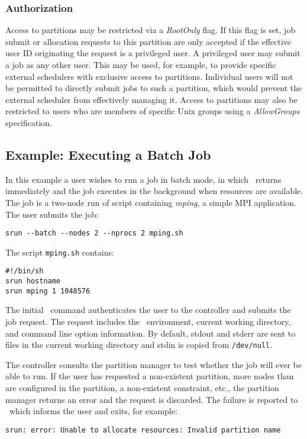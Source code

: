\documentclass[10pt,onecolumn,times]{../common/llncs}
\begin{document}
{\subsubsection{Authorization}

Access to partitions may be restricted via a {\em RootOnly} flag.
If this flag is set, job submit or allocation requests to this partition
are only accepted if the effective user ID originating the request is a
privileged user.  A privileged user may submit a job as any other user.
This may be used, for example, to provide specific external schedulers
with exclusive access to partitions.  Individual users will not be
permitted to directly submit jobs to such a partition, which would
prevent the external scheduler from effectively managing it.  Access to
partitions may also be restricted to users who are members of specific
Unix groups using a {\em AllowGroups} specification.

\subsection{Example: Executing a Batch Job}

In this example a user wishes to run a job in batch mode, in which \srun\
returns immediately and the job executes in the background when resources
are available.  The job is a two-node run of script containing {\em mping}, 
a simple MPI application.  The user submits the job:

\begin{verbatim}
srun --batch --nodes 2 --nprocs 2 mping.sh
\end{verbatim}
The script {\tt mping.sh} contains:
\begin{verbatim}
#!/bin/sh
srun hostname
srun mping 1 1048576
\end{verbatim}

The initial \srun\ command authenticates the user to the controller and
submits the job request.  The request includes the \srun\ environment,
current working directory, and command line option information. By
default, stdout and stderr are sent to files in the current working
directory and stdin is copied from {\tt /dev/null}.

The controller consults the partition manager to test whether the job 
will ever be able to run.  If the user has requested a non-existent partition,
more nodes than are configured in the partition, a non-existent constraint, 
etc., the partition manager returns an error and the request is discarded.
The failure is reported to \srun\ which informs the user and exits, for example:
\begin{verbatim}
srun: error: Unable to allocate resources: Invalid partition name
\end{verbatim}

}
\end{document}
